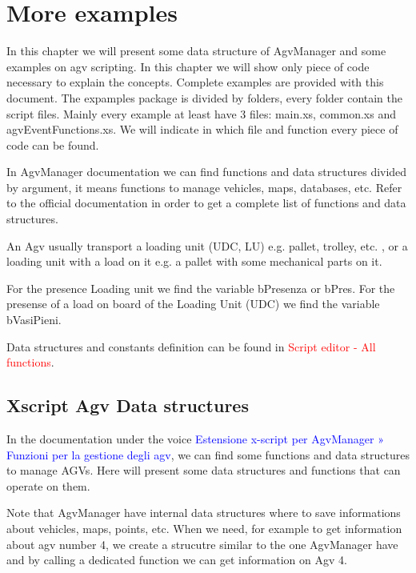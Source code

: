 

\chapter{More examples}
In this chapter we will present some data structure of AgvManager and some examples on agv scripting. In this chapter we will show only piece of code necessary to explain the concepts. Complete examples are provided with this document. The expamples package is divided by folders, every folder contain the script files. Mainly every example at least have 3 files: main.xs, common.xs and agvEventFunctions.xs. We will indicate in which file and function every piece of code can be found.

In AgvManager documentation we can find functions and data structures divided by argument, it means functions to manage vehicles, maps, databases, etc. Refer to the official documentation in order to get a complete list of functions and data structures.

An Agv usually transport a loading unit (UDC, LU) e.g. pallet, trolley, etc. , or a loading unit with a load on it e.g. a pallet with some mechanical parts on it.

For the presence Loading unit we find the variable bPresenza or bPres.
For the presense of a load on board of the Loading Unit (UDC) we find the variable bVasiPieni.

Data structures and constants definition can be found in \textcolor{red}{Script editor - All functions}.
\section{Xscript Agv Data structures}
In the documentation under the voice \textcolor{blue}{Estensione x-script per AgvManager » Funzioni per la gestione degli agv}, we can find some functions and data structures to manage AGVs. Here will present some data structures and functions that can operate on them.

Note that AgvManager have internal data structures where to save informations about vehicles, maps, points, etc. When we need, for example to get information about agv number 4, we create a strucutre similar to the one AgvManager have and by calling a dedicated function we can get information on Agv 4.

